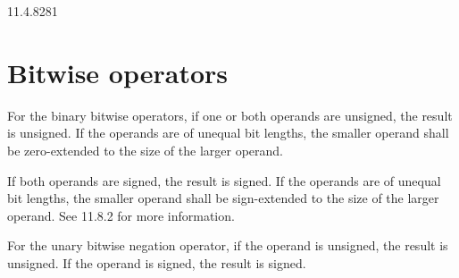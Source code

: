 \documentclass{article}
\begin{document}
\setcounter{section}{7}

\begin{lrmquote}{11.4.8}{281}

  \section{Bitwise operators}

  \textelp{}

  For the binary bitwise operators, if one or both operands are unsigned, the
  result is unsigned.
    {
      \color{red}
      If the operands are of unequal bit lengths, the smaller
      operand shall be zero-extended to the size of the larger operand.
    }

  If both operands are signed, the result is signed.
    {
      \color{red}
      If the operands are of
      unequal bit lengths, the smaller operand shall be sign-extended to the size of
      the larger operand. See 11.8.2 for more information.
    }

  For the unary bitwise negation operator, if the operand is unsigned, the result
  is unsigned. If the operand is signed, the result is signed.

  \textelp{}
\end{lrmquote}

\renewcommand{\thesection}{11.6.\arabic{section}}
\setcounter{section}{0}
\end{document}
